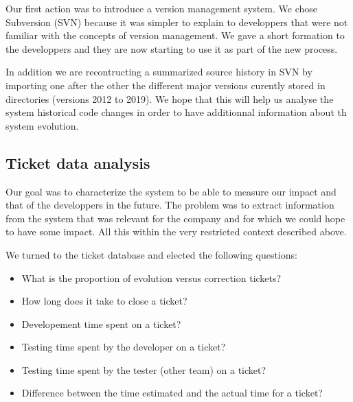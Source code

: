 \documentclass[10pt,conference]{IEEEtran}
\begin{document}
Our first action was to introduce a version management system.
We chose  Subversion (SVN) because it was simpler to explain to developpers that were not familiar with the concepts of version management.
We gave a short formation to the developpers and they are now starting to use it as part of the new process.

In addition we are recontructing a summarized source history in SVN by importing one after the other the different major versions curently stored in directories (versions 2012 to 2019). 
We hope that this will help us analyse the system historical code changes in order to have additionnal information about th system evolution.

\subsection{Ticket data analysis}

Our goal was to characterize the system to be able to measure our impact and that of the developpers in the future.
The problem was to extract information from the system that was relevant for the company and for which we could hope to have some impact.
All this within the very restricted context described above.

We turned to the ticket database and elected the following questions:
\begin{itemize}
 \item What is the proportion of evolution versus correction tickets?
 \item How long does it take to close a ticket?
 \item Developement time spent on a ticket?
 \item Testing time spent by the developer on a ticket?
 \item Testing time spent by the tester (other team) on a ticket?
 \item Difference between the time estimated and the actual time for a ticket?
 \end{itemize}
 
\end{document}
